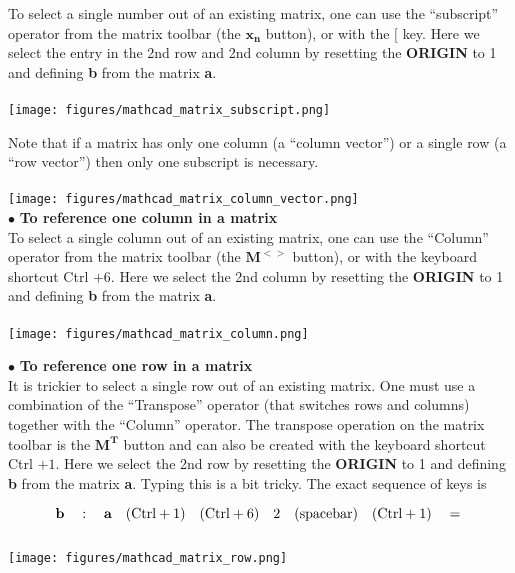 To select a single number out of an existing matrix, one can use the ``subscript'' operator from the matrix toolbar (the $\textbf{x}_\textbf{n}$ button), or with the $[$ key.  Here we select the entry in the 2nd row and 2nd column by resetting the \textbf{ORIGIN} to 1 and defining \textbf{b} from the matrix \textbf{a}.\\
\\
\texttt{[image: figures/mathcad\_matrix\_subscript.png]}

Note that if a matrix has only one column (a ``column vector'') or a single row (a ``row vector'') then only one subscript is necessary.\\
\\
\texttt{[image: figures/mathcad\_matrix\_column\_vector.png]}\\

$\bullet$ \textbf{To reference one column in a matrix}\\

To select a single column out of an existing matrix, one can use the ``Column'' operator from the matrix toolbar (the $\textbf{M}^{<>}$ button), or with the keyboard shortcut Ctrl $+ 6$.  Here we select the 2nd column by resetting the \textbf{ORIGIN} to 1 and defining \textbf{b} from the matrix \textbf{a}.\\
\\
\texttt{[image: figures/mathcad\_matrix\_column.png]}

$\bullet$ \textbf{To reference one row in a matrix}\\

It is trickier to select a single row out of an existing matrix.  One must use a combination of the ``Transpose'' operator (that switches rows and columns) together with the ``Column'' operator.  The transpose operation on the matrix toolbar is the $\textbf{M}^{\textbf{T}}$ button and can also be created with the keyboard shortcut Ctrl $+ 1$.  Here we select the 2nd row by resetting the \textbf{ORIGIN} to 1 and defining \textbf{b} from the matrix \textbf{a}.  Typing this is a bit tricky.  The exact sequence of keys is 

\[
\textbf{b} \quad : \quad \textbf{a} \quad (\text{Ctrl} + 1) \quad (\text{Ctrl} + 6) \quad 2 \quad (\text{spacebar}) \quad (\text{Ctrl} + 1) \quad = \\
\]
\\
\texttt{[image: figures/mathcad\_matrix\_row.png]}\\

